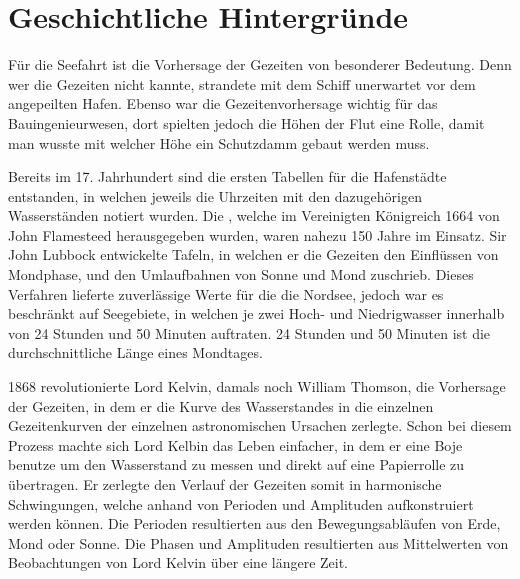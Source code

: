%
%
%
%
\section{Geschichtliche Hintergründe\label{gezeiten:section:Geschichtliche Hintergründe}}
Für die Seefahrt ist die Vorhersage der Gezeiten von besonderer Bedeutung.
Denn wer die Gezeiten nicht kannte, strandete mit dem Schiff unerwartet vor dem angepeilten Hafen.
Ebenso war die Gezeitenvorhersage wichtig für das Bauingenieurwesen, dort spielten jedoch die Höhen der Flut eine Rolle, damit man wusste mit welcher Höhe ein Schutzdamm gebaut werden muss.

Bereits im 17. Jahrhundert sind die ersten Tabellen für die Hafenstädte entstanden,
in welchen jeweils die Uhrzeiten mit den dazugehörigen Wasserständen notiert wurden.
Die \grqq, welche im Vereinigten Königreich 1664 von John Flamesteed
herausgegeben wurden, waren nahezu 150 Jahre im Einsatz.
Sir John Lubbock entwickelte Tafeln, 
in welchen er die Gezeiten den Einflüssen von Mondphase, und den Umlaufbahnen von
Sonne und Mond zuschrieb. Dieses Verfahren lieferte zuverlässige Werte für die
die Nordsee, jedoch war es beschränkt auf Seegebiete, in welchen je zwei Hoch- und Niedrigwasser innerhalb von 24 Stunden und 50 Minuten auftraten. 24 Stunden und 50 Minuten ist die durchschnittliche Länge eines Mondtages.

1868 revolutionierte Lord Kelvin, damals noch William Thomson, die Vorhersage der Gezeiten, in dem er die Kurve des Wasserstandes in die einzelnen Gezeitenkurven der einzelnen astronomischen Ursachen zerlegte.
Schon bei diesem Prozess machte sich Lord Kelbin das Leben einfacher, in dem er eine Boje benutze um den Wasserstand zu messen und direkt auf eine Papierrolle zu übertragen.
Er zerlegte den Verlauf der Gezeiten somit in harmonische Schwingungen, welche anhand von Perioden und Amplituden aufkonstruiert werden können.
Die Perioden resultierten aus den Bewegungsabläufen von Erde, Mond oder Sonne.
Die Phasen und Amplituden resultierten aus Mittelwerten von Beobachtungen von Lord Kelvin über eine längere Zeit.




